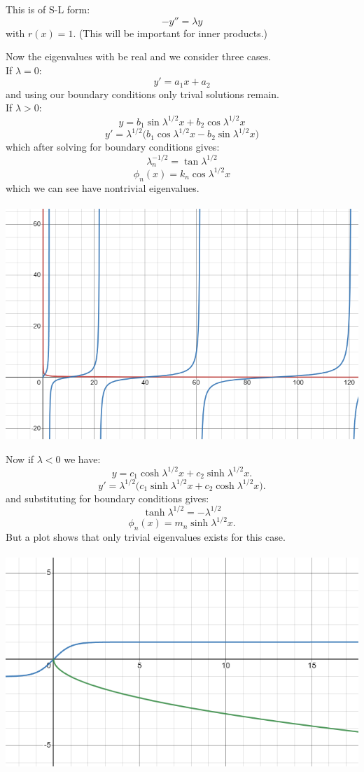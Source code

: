 \begin{enumerate}
    This is of S-L form:
    $$-y''=\lambda y$$
    with $r(x)=1$. (This will be important for inner products.)

    Now the eigenvalues with be real and we consider three cases. \\

    If $\lambda=0$:
    $$y'=a_1x+a_2$$
    and using our boundary conditions only trival solutions remain. \\

    If $\lambda>0$:
    $$y=b_1\sin\lambda^{1/2}x+b_2\cos\lambda^{1/2}x$$
    $$y'=\lambda^{1/2}\bigl(b_1\cos\lambda^{1/2}x-b_2\sin\lambda^{1/2}x\bigl)$$
    which after solving for boundary conditions gives:
    $$\lambda_n^{-1/2}=\tan\lambda^{1/2}$$
    $$\phi_n(x)=k_n\cos\lambda^{1/2}x$$
    which we can see have nontrivial eigenvalues. \\\\
    \includegraphics[scale=0.4]{w09_1c.png}

    \newpage
    Now if $\lambda<0$ we have:
    $$y=c_1\cosh\lambda^{1/2}x+c_2\sinh\lambda^{1/2}x.$$
    $$y'=\lambda^{1/2}\bigl(c_1\sinh\lambda^{1/2}x+c_2\cosh\lambda^{1/2}x\bigr).$$
    and substituting for boundary conditions gives:
    $$\tanh\lambda^{1/2}=-\lambda^{1/2}$$
    $$\phi_n(x)=m_n\sinh\lambda^{1/2}x.$$
    But a plot shows that only trivial eigenvalues exists for this case. \\\\
    \includegraphics[scale=0.4]{w09_1c_1.png}


\end{enumerate}
